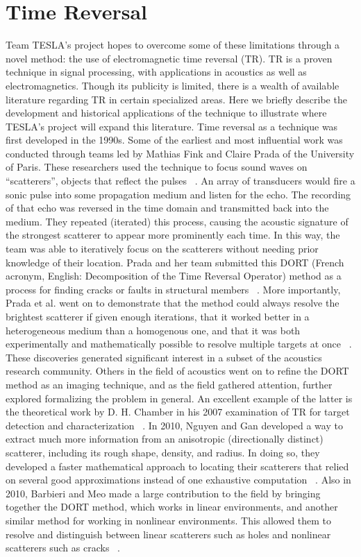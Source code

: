 \section{Time Reversal}
\label{lit-review-tr}

Team TESLA’s project hopes to overcome some of these limitations through a novel method: the use of electromagnetic time reversal (TR). TR is a proven technique in signal processing, with applications in acoustics as well as electromagnetics. Though its publicity is limited, there is a wealth of available literature regarding TR in certain specialized areas. Here we briefly describe the development and historical applications of the technique to illustrate where TESLA’s project will expand this literature.
Time reversal as a technique was first developed in the 1990s. Some of the earliest and most influential work was conducted through teams led by Mathias Fink and Claire Prada of the University of Paris. These researchers used the technique to focus sound waves on “scatterers”, objects that reflect the pulses ~\cite{prada_iterative_1991}. An array of transducers would fire a sonic pulse into some propagation medium and listen for the echo. The recording of that echo was reversed in the time domain and transmitted back into the medium. They repeated (iterated) this process, causing the acoustic signature of the strongest scatterer to appear more prominently each time. In this way, the team was able to iteratively focus on the scatterers without needing prior knowledge of their location. Prada and her team submitted this DORT (French acronym, English: Decomposition of the Time Reversal Operator) method as a process for finding cracks or faults in structural members ~\cite{prada_iterative_1991}. More importantly, Prada et al. went on to demonstrate that the method could always resolve the brightest scatterer if given enough iterations, that it worked better in a heterogeneous medium than a homogenous one, and that it was both experimentally and mathematically possible to resolve multiple targets at once ~\cite{prada_decomposition_1996}. These discoveries generated significant interest in a subset of the acoustics research community.
Others in the field of acoustics went on to refine the DORT method as an imaging technique, and as the field gathered attention, further explored formalizing the problem in general. An excellent example of the latter is the theoretical work by D. H. Chamber in his 2007 examination of TR for target detection and characterization ~\cite{chambers_target_2007}. In 2010, Nguyen and Gan developed a way to extract much more information from an anisotropic (directionally distinct) scatterer, including its rough shape, density, and radius. In doing so, they developed a faster mathematical approach to locating their scatterers that relied on several good approximations instead of one exhaustive computation ~\cite{nguyen_dort_2010}. Also in 2010, Barbieri and Meo made a large contribution to the field by bringing together the DORT method, which works in linear environments, and another similar method for working in nonlinear environments. This allowed them to resolve and distinguish between linear scatterers such as holes and nonlinear scatterers such as cracks ~\cite{barbieri_time_2010}.
